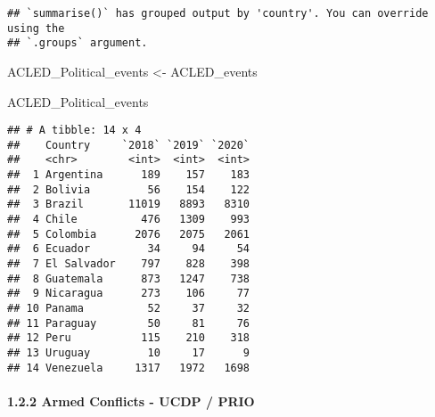 \documentclass[
  11pt,
]{article}
\newenvironment{Shaded}{\begin{snugshade}}{\end{snugshade}}
\newcommand{\NormalTok}[1]{#1}
\newcommand{\OtherTok}[1]{\textcolor[rgb]{0.56,0.35,0.01}{#1}}
\begin{document}
\begin{verbatim}
## `summarise()` has grouped output by 'country'. You can override using the
## `.groups` argument.
\end{verbatim}

\begin{Shaded}
\begin{Highlighting}[]
\NormalTok{ACLED\_Political\_events }\OtherTok{\textless{}{-}}\NormalTok{ ACLED\_events}

\NormalTok{ACLED\_Political\_events}
\end{Highlighting}
\end{Shaded}

\begin{verbatim}
## # A tibble: 14 x 4
##    Country     `2018` `2019` `2020`
##    <chr>        <int>  <int>  <int>
##  1 Argentina      189    157    183
##  2 Bolivia         56    154    122
##  3 Brazil       11019   8893   8310
##  4 Chile          476   1309    993
##  5 Colombia      2076   2075   2061
##  6 Ecuador         34     94     54
##  7 El Salvador    797    828    398
##  8 Guatemala      873   1247    738
##  9 Nicaragua      273    106     77
## 10 Panama          52     37     32
## 11 Paraguay        50     81     76
## 12 Peru           115    210    318
## 13 Uruguay         10     17      9
## 14 Venezuela     1317   1972   1698
\end{verbatim}

\paragraph{1.2.2 Armed Conflicts - UCDP /
PRIO}\label{armed-conflicts---ucdp-prio}
\end{document}

